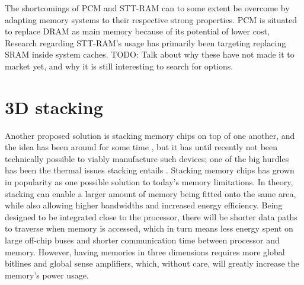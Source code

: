 The shortcomings of PCM and STT-RAM can to some extent be overcome by adapting memory systems to their respective strong properties. PCM is situated to replace DRAM as main memory because of its potential of lower cost, 
Research regarding STT-RAM's usage has primarily been targeting replacing SRAM inside system caches. 
TODO: Talk about why these have not made it to market yet, and why it is still interesting to search for options.

\section{3D stacking}
Another proposed solution is stacking memory chips on top of one another, and the idea has been around for some time \cite{lee2000three}\cite{jacob2005predicting}\cite{black2006stacking}, but it has until recently not been technically possible to viably manufacture such devices; one of the big hurdles has been the thermal issues stacking entails \cite{5074080}. Stacking memory chips has grown in popularity as one possible solution to today's memory limitations. In theory, stacking can enable a larger amount of memory being fitted onto the same area, while also allowing higher bandwidths and increased energy efficiency\cite{Lee:2016:SMA:2836331.2832911}. Being designed to be integrated close to the processor, there will be shorter data paths to traverse when memory is accessed, which in turn means less energy spent on large off-chip buses and shorter communication time between processor and memory. However, having memories in three dimensions requires more global bitlines and global sense amplifiers, which, without care, will greatly increase the memory's power usage.
\bigskip

